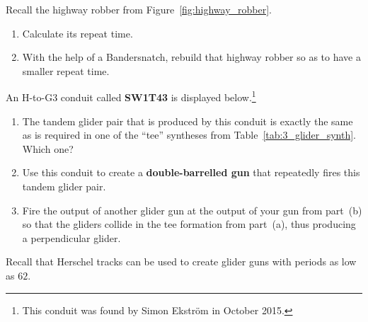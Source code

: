 \begin{multicols}{2}
\mfilbreak


\begin{problem}\label{exer:better_highway_robber_bandersnatch}
	Recall the highway robber from Figure~\ref{fig:highway_robber}.\smallskip
	
	\begin{enumerate}[label=\bf\color{ocre}(\alph*)]
		\item {} Calculate its repeat time.
		
		\item {} With the help of a Bandersnatch, rebuild that highway robber so as to have a smaller repeat time.
	\end{enumerate}
\end{problem}


\mfilbreak


\begin{problem}\label{exer:herschel_tee}
	An H-to-G3 conduit called \textbf{SW1T43} is displayed below.\footnote{This conduit was found by Simon Ekstr\"{o}m in October 2015.}
	
	\begin{center}
	\end{center}

	\begin{enumerate}[label=\bf\color{ocre}(\alph*)]
		\item {} The tandem glider pair that is produced by this conduit is exactly the same as is required in one of the ``tee'' syntheses from Table~\ref{tab:3_glider_synth}. Which one?
		
		\item {} Use this conduit to create a \textbf{double-barrelled gun} that repeatedly fires this tandem glider pair.
		
		\item {} Fire the output of another glider gun at the output of your gun from part~(b) so that the gliders collide in the tee formation from part~(a), thus producing a perpendicular glider.
	\end{enumerate}
\end{problem}

	
	\mfilbreak
	
	
	\begin{problem}\label{exer:p62_gun_problem}
		Recall that Herschel tracks can be used to create glider guns with periods as low as $62$.\smallskip
		

\end{problem}
\end{multicols}

